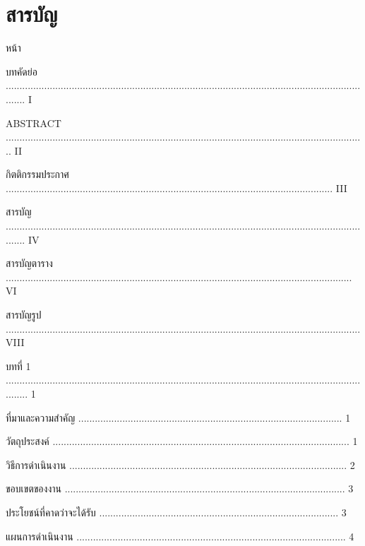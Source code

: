 \documentclass[12pt,a4paper]{report}
\begin{document}
\section*{สารบัญ}
หน้า\par
บทคัดย่อ ........................................................................................................................................ I\par
ABSTRACT ................................................................................................................................... II\par
กิตติกรรมประกาศ ....................................................................................................................... III\par
สารบัญ ........................................................................................................................................ IV\par
สารบัญตาราง .............................................................................................................................. VI\par
สารบัญรูป ................................................................................................................................. VIII\par
บทที่ 1 ......................................................................................................................................... 1\par
{} ที่มาและความสําคัญ ................................................................................................ 1\par
{} วัตถุประสงค์ ............................................................................................................ 1\par
{} วิธีการดําเนินงาน ..................................................................................................... 2\par
{} ขอบเขตของงาน ...................................................................................................... 3\par
{} ประโยชน์ที่คาดว่าจะได้รับ ....................................................................................... 3\par
{} แผนการดำเนินงาน .................................................................................................. 4\par
\end{document}
